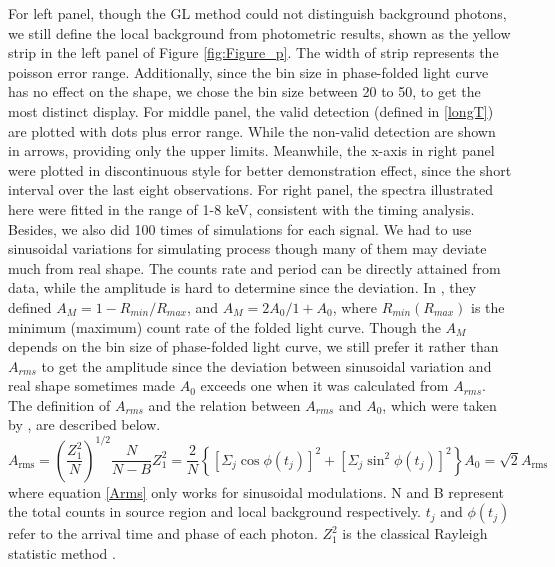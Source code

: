 \documentclass[twoside,twocolumn]{aastex63}
\begin{document}
For left panel, though the GL method could not distinguish background photons, we still define the local background from photometric results, shown as the yellow strip in the left panel of Figure \ref{fig:Figure_p}. The width of strip represents the poisson error range.
Additionally, since the bin size in phase-folded light curve has no effect on the shape, we chose the bin size between 20 to 50, to get the most distinct display. 
For middle panel, the valid detection (defined in \ref{longT}) are plotted with dots plus error range. While the non-valid detection are shown in arrows, providing only the upper limits. Meanwhile, the x-axis in right panel were plotted in discontinuous style for better demonstration effect, since the short interval over the last eight observations. 
For right panel, the spectra illustrated here were fitted in the range of 1-8 keV, consistent with the timing analysis. 
\\
\indent
Besides, we also did 100 times of simulations for each signal. We had to use sinusoidal variations for simulating process though many of them may deviate much from real shape. The counts rate and period can be directly attained from data, while the amplitude is hard to determine since the deviation. In \citet{2012ApJ...746..165H}, they defined $A_{M}={1-R_{min}}/R_{max}$, and $A_{M}=2A_0/{1+A_0}$, where $R_{min}(R_{max})$ is the minimum (maximum) count rate of the folded light curve. 
Though the $A_{M}$ depends on the bin size of phase-folded light curve, we still prefer it rather than $A_{rms}$ to get the amplitude since the deviation between sinusoidal variation and real shape sometimes made $A_{0}$ exceeds one when it was calculated from $A_{rms}$. The definition of $A_{rms}$ and the relation between 
$A_{rms}$ and $A_0$, which were taken by \cite{2012ApJ...746..165H}, are described below.
\begin{subequations}
\begin{equation}
A_{\mathrm{rms}}=\left(\frac{Z_{1}^{2}}{N}\right)^{1 / 2} \frac{N}{N-B}
\end{equation}
\begin{equation}
Z_{1}^{2}=\frac{2}{N}\left\{\left[\Sigma_{j} \cos \phi\left(t_{j}\right)\right]^{2}+\left[\Sigma_{j} \sin ^{2} \phi\left(t_{j}\right)\right]^{2}\right\}
\end{equation}
\begin{equation}\label{Arms}
A_0=\sqrt{2} A_{\mathrm{rms}}
\end{equation}
\end{subequations}
where equation \ref{Arms} only works for sinusoidal modulations. N and B represent the total counts in source region and local background respectively. $t_{j}$ and $\phi\left(t_{j}\right)$ refer to the arrival time and phase of each photon. $Z_{1}^{2}$ is the classical Rayleigh statistic method \citep{1983A&A...128..245B,2003ApJ...599..465M}.
\end{document}
